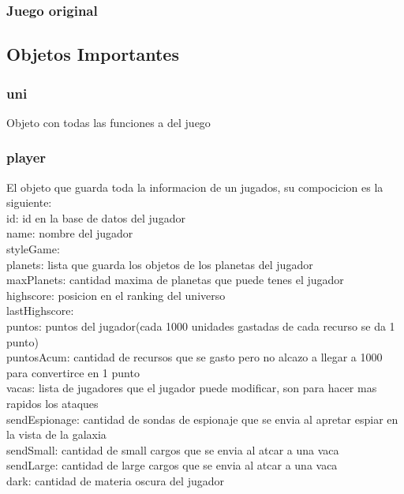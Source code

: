 \documentclass{article}
\newcommand\tab[1][1cm]{\hspace*{#1}}
\begin{document}
        \subsubsection{Juego original}
    \subsection{Objetos Importantes}
        \subsubsection{uni} Objeto con todas las funciones a del juego
        \subsubsection{player} El objeto que guarda toda la informacion de un jugados, su compocicion es la siguiente: \\
            \tab id: id en la base de datos del jugador \\
            \tab name: nombre del jugador \\
            \tab styleGame: \\
            \tab planets: lista que guarda los objetos de los planetas del jugador \\
            \tab maxPlanets: cantidad maxima de planetas que puede tenes el jugador \\
            \tab highscore: posicion en el ranking del universo\\
            \tab lastHighscore: \\
            \tab puntos: puntos del jugador(cada 1000 unidades gastadas de cada recurso se da 1 punto)\\
            \tab puntosAcum: cantidad de recursos que se gasto pero no alcazo a llegar a 1000 para convertirce en 1 punto\\
            \tab vacas: lista de jugadores que el jugador puede modificar, son para hacer mas rapidos los ataques\\
            \tab sendEspionage: cantidad de sondas de espionaje que se envia al apretar espiar en la vista de la galaxia\\
            \tab sendSmall: cantidad de small cargos que se envia al atcar a una vaca \\
            \tab sendLarge: cantidad de large cargos que se envia al atcar a una vaca\\
            \tab dark: cantidad de materia oscura del jugador  \\
\end{document}

